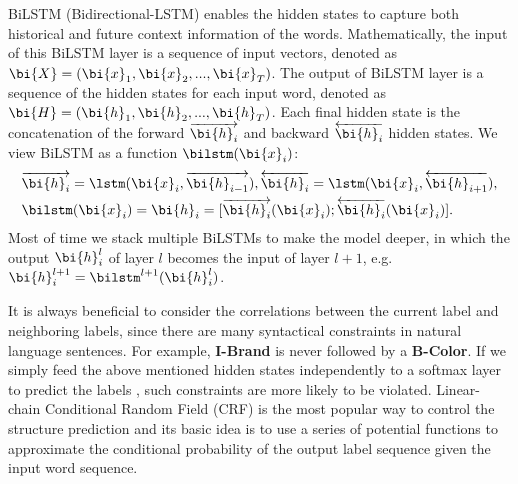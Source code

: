 BiLSTM (Bidirectional-LSTM) enables the
hidden states to capture both historical and future
context information of the words.
Mathematically, the input of this BiLSTM layer
is a sequence of input vectors,
denoted as $\bi{X}=(\bi{x}_1, \bi{x}_2, ..., \bi{x}_T)$.
The output of BiLSTM layer is a sequence of the hidden
states for each input word, denoted
as $\bi{H}=(\bi{h}_1, \bi{h}_2, ..., \bi{h}_T)$.
Each final hidden state is the concatenation of the forward
$\overrightarrow{\bi{h}_i}$ and backward $\overleftarrow{\bi{h}_i}$ hidden states.
We view BiLSTM as a function $\bilstm(\bi{x}_i)$:
\begin{eqnarray*}
	& \overrightarrow{\bi{h}_i} = \lstm(\bi{x}_i, \overrightarrow{\bi{h}_{i-1}}),
	\overleftarrow{\bi{h}_i} = \lstm(\bi{x}_i, \overleftarrow{\bi{h}_{i+1}}), \\
	& \bilstm(\bi{x}_i) = \bi{h}_i = [\overrightarrow{\bi{h}_i}(\bi{x}_i);\overleftarrow{\bi{h}_i}(\bi{x}_i)].
\end{eqnarray*}
Most of time we stack multiple BiLSTMs to make the model deeper,
in which the output $\bi{h}_i^l$ of layer $l$ becomes the input of layer $l+1$,
e.g. $\bi{h}_i^{l+1}=\bilstm^{l+1}(\bi{h}_i^l)$.

It is always beneficial to consider the correlations
between the current label and neighboring
labels, since there are many syntactical constraints
in natural language sentences.
For example,
\textbf{I-Brand} is never followed by a \textbf{B-Color}.
If we simply feed the above mentioned hidden states
independently to a softmax layer to predict the labels \cite{hakanni-tur2016multidomain},
such constraints are more likely
to be violated. Linear-chain Conditional Random
Field (CRF) \cite{lafferty2001conditional} 
is the most popular way to control the structure
prediction and its basic idea is to use a series
of potential functions to approximate the conditional
probability of the output label sequence
given the input word sequence.

